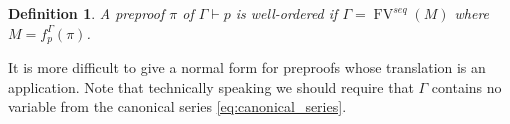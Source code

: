 \documentclass[english,letter paper,12pt,leqno]{article}
\theoremstyle{example}
\newtheorem{definition}[theorem]{Definition}
\numberwithin{equation}{section}
\begin{document}
\begin{definition}\label{definition:well_ordered} A preproof $\pi$ of $\Gamma \vdash p$ is \emph{well-ordered} if $\Gamma = \operatorname{FV}^{seq}(M)$ where $M = f^\Gamma_p(\pi)$.
\end{definition}

It is more difficult to give a normal form for preproofs whose translation is an application. Note that technically speaking we should require that $\Gamma$ contains no variable from the canonical series \eqref{eq:canonical_series}.%
\end{document}
